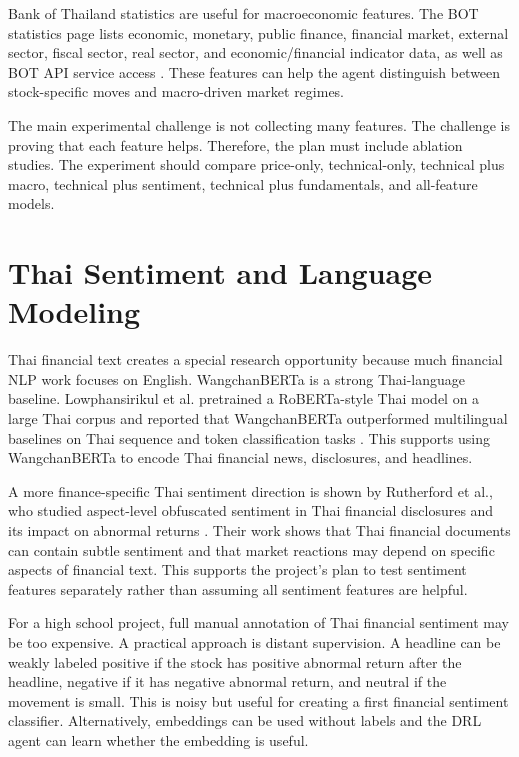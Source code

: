 \documentclass[11pt]{article}
\begin{document}
Bank of Thailand statistics are useful for macroeconomic features. The BOT statistics page lists economic, monetary, public finance, financial market, external sector, fiscal sector, real sector, and economic/financial indicator data, as well as BOT API service access \cite{bot}. These features can help the agent distinguish between stock-specific moves and macro-driven market regimes.

The main experimental challenge is not collecting many features. The challenge is proving that each feature helps. Therefore, the plan must include ablation studies. The experiment should compare price-only, technical-only, technical plus macro, technical plus sentiment, technical plus fundamentals, and all-feature models.

\section{Thai Sentiment and Language Modeling}
Thai financial text creates a special research opportunity because much financial NLP work focuses on English. WangchanBERTa is a strong Thai-language baseline. Lowphansirikul et al. pretrained a RoBERTa-style Thai model on a large Thai corpus and reported that WangchanBERTa outperformed multilingual baselines on Thai sequence and token classification tasks \cite{wangchanberta}. This supports using WangchanBERTa to encode Thai financial news, disclosures, and headlines.

A more finance-specific Thai sentiment direction is shown by Rutherford et al., who studied aspect-level obfuscated sentiment in Thai financial disclosures and its impact on abnormal returns \cite{thaiabsa}. Their work shows that Thai financial documents can contain subtle sentiment and that market reactions may depend on specific aspects of financial text. This supports the project's plan to test sentiment features separately rather than assuming all sentiment features are helpful.

For a high school project, full manual annotation of Thai financial sentiment may be too expensive. A practical approach is distant supervision. A headline can be weakly labeled positive if the stock has positive abnormal return after the headline, negative if it has negative abnormal return, and neutral if the movement is small. This is noisy but useful for creating a first financial sentiment classifier. Alternatively, embeddings can be used without labels and the DRL agent can learn whether the embedding is useful.
\end{document}
